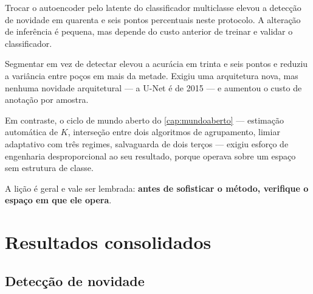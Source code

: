 \begin{destaque}
Trocar o autoencoder pelo latente do classificador multiclasse elevou a detecção de
novidade em quarenta e seis pontos percentuais neste protocolo. A alteração de inferência
é pequena, mas depende do custo anterior de treinar e validar o classificador.

Segmentar em vez de detectar elevou a acurácia em trinta e seis pontos e reduziu a
variância entre poços em mais da metade. Exigiu uma arquitetura nova, mas nenhuma
novidade arquitetural --- a U-Net é de 2015 --- e aumentou o custo de anotação por
amostra.

Em contraste, o ciclo de mundo aberto do \cref{cap:mundoaberto} --- estimação automática
de $K$, interseção entre dois algoritmos de agrupamento, limiar adaptativo com três
regimes, salvaguarda de dois terços --- exigiu esforço de engenharia desproporcional ao
seu resultado, porque operava sobre um espaço sem estrutura de classe.

A lição é geral e vale ser lembrada: \textbf{antes de sofisticar o método, verifique o
espaço em que ele opera}.
\end{destaque}

\section{Resultados consolidados}

\subsection{Detecção de novidade}

